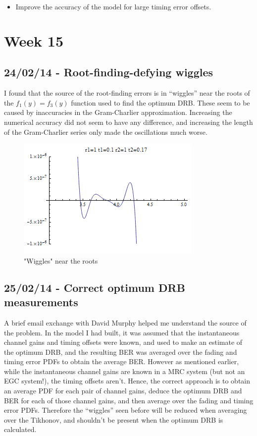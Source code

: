 \begin{itemize}
\itemsep1pt\parskip0pt
\item
  Improve the accuracy of the model for large timing error offsets.
\end{itemize}

\section{Week 15}

\subsection{24/02/14 - Root-finding-defying wiggles}

I found that the source of the root-finding errors is in ``wiggles''
near the roots of the $f_1(y)=f_3(y)$ function used to find the optimum
DRB. These seem to be caused by inaccuracies in the Gram-Charlier
approximation. Increasing the numerical accuracy did not seem to have
any difference, and increasing the length of the Gram-Charlier series
only made the oscillations much worse.

\begin{figure}[htbp]
\centering
\includegraphics{../../../plots/rootfindingconfusion_M20_cropped.png}
\caption{"Wiggles" near the roots}
\end{figure}

\subsection{25/02/14 - Correct optimum DRB measurements}

A brief email exchange with David Murphy helped me understand the source of the
problem. In the model I had built, it was assumed that the instantaneous
channel gains and timing offsets were known, and used to make an
estimate of the optimum DRB, and the resulting BER was averaged over the
fading and timing error PDFs to obtain the average BER. However as
mentioned earlier, while the instantaneous channel gains are known in a
MRC system (but not an EGC system!), the timing offsets aren't. Hence,
the correct approach is to obtain an average PDF for each pair of
channel gains, deduce the optimum DRB and BER for each of those channel
gains, and then average over the fading and timing error PDFs. Therefore
the ``wiggles'' seen before will be reduced when averaging over the
Tikhonov, and shouldn't be present when the optimum DRB is calculated.

